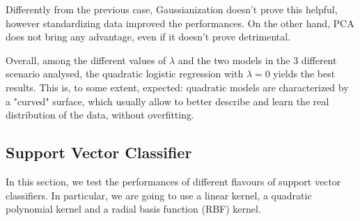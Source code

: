 Differently from the previous case, Gaussianization doesn't prove this helpful, however standardizing data improved the performances. On the other hand, PCA does not bring any advantage, even if it doesn't prove detrimental.

Overall, among the different values of $\lambda$ and the two models in the 3 different scenario analysed, the quadratic logistic regression with $\lambda=0$ yields the best results. This is, to some extent, expected: quadratic models are characterized by a "curved" surface, which usually allow to better describe and learn the real distribution of the data, without overfitting.




\subsection{Support Vector Classifier}
In this section, we test the performances of 
different flavours of support vector classifiers. In particular, we are going to use a linear kernel, a quadratic polynomial kernel and a radial basis function (RBF) kernel.

\noindent
\begin{table}[H]
	\caption{min DCF for Support Vector Classifier models, with and without feature balancing.}
	\label{tab:svc_res}
\end{table}

